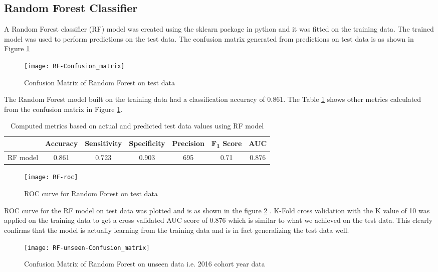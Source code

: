 \documentclass[11pt,openright]{report}
\begin{document}
\subsection {Random Forest Classifier}
A Random Forest classifier (RF) model was created using the sklearn package in python and it was fitted on the training data. The trained model was used to perform predictions on the test data. The confusion matrix generated from predictions on test data is as shown in Figure \ref{fig:RF_confusion_matrix}

  \begin{figure}[!htb]
	\centering
	\texttt{[image: RF-Confusion\_matrix]}
	\caption{Confusion Matrix of Random Forest on test data}
	\label{fig:RF_confusion_matrix}
\end{figure} 

The Random Forest model built on the training data had a classification accuracy of 0.861. The Table \ref{table:RF_confusion_matrix} shows other metrics calculated from the confusion matrix in Figure \ref{fig:RF_confusion_matrix}. 
\begin{table}[!htb]
	\renewcommand{\arraystretch}{1.3}
	\caption{Computed metrics based on actual and predicted test data values using RF model}
	\label{table:RF_confusion_matrix}
	\centering
	\begin{tabular}{|c|c|c|c|c|c|c|}
    \hline
  	 & \bfseries Accuracy & \bfseries Sensitivity & \bfseries Specificity & \bfseries Precision & \bfseries F\textsubscript{1} Score  & \bfseries AUC\\  
    \hline
	RF model & 0.861 & 0.723 & 0.903 & 695 & 0.71 & 0.876 \\ \hline
	\end{tabular} 
\end{table}

 \begin{figure}[!htb]
	\centering
	\texttt{[image: RF-roc]}
	\caption{ROC curve for Random Forest on test data}
	\label{fig:RF_roc}
\end{figure} 

ROC curve for the RF model on test data was plotted and is as shown in the figure \ref{fig:RF_roc} . K-Fold cross validation with the K value of 10 was applied on the training data to get a cross validated AUC score of 0.876 which is similar to what we achieved on the test data. This clearly confirms that the model is actually learning from the training data and is in fact generalizing the test data well.

  \begin{figure}[!htb]
	\centering
	\texttt{[image: RF-unseen-Confusion\_matrix]}
	\caption{Confusion Matrix of Random Forest on unseen data i.e. 2016 cohort year data}
	\label{fig:RF_unseen_confusion_matrix}
\end{figure} 
\end{document}
